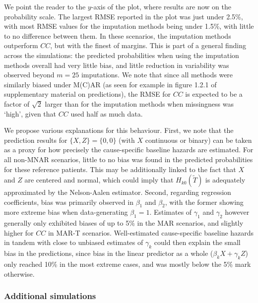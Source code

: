 \documentclass[
  letterpaper,
  DIV=11,
  numbers=noendperiod]{scrreprt}
\begin{document}
We point the reader to the \(y\)-axis of the plot, where results are now
on the probability scale. The largest RMSE reported in the plot was just
under 2.5\%, with most RMSE values for the imputation methods being
under 1.5\%, with little to no difference between them. In these
scenarios, the imputation methods outperform \(CC\), but with the finest
of margins. This is part of a general finding across the simulations:
the predicted probabilities when using the imputation methods overall
had very little bias, and little reduction in variability was observed
beyond \(m = 25\) imputations. We note that since all methods were
similarly biased under M(C)AR (as seen for example in figure 1.2.1 of
supplementary material on predictions), the RMSE for \(CC\) is expected
to be a factor of \(\sqrt{2}\) larger than for the imputation methods
when missingness was `high', given that \(CC\) used half as much data.

We propose various explanations for this behaviour. First, we note that
the prediction results for \(\{X,Z\} = \{0, 0\}\) (with \(X\) continuous
or binary) can be taken as a proxy for how precisely the cause-specific
baseline hazards are estimated. For all non-MNAR scenarios, little to no
bias was found in the predicted probabilities for these reference
patients. This may be additionally linked to the fact that \(X\) and
\(Z\) are centered and normal, which could imply that
\(H_{k0}(\tilde{T})\) is adequately approximated by the Nelson-Aalen
estimator. Second, regarding regression coefficients, bias was primarily
observed in \(\beta_1\) and \(\beta_2\), with the former showing more
extreme bias when data-generating \(\beta_1 = 1\). Estimates of
\(\gamma_1\) and \(\gamma_2\) however generally only exhibited biases of
up to 5\% in the MAR scenarios, and slightly higher for \(CC\) in MAR-T
scenarios. Well-estimated cause-specific baseline hazards in tandem with
close to unbiased estimates of \(\gamma_k\) could then explain the small
bias in the predictions, since bias in the linear predictor as a whole
(\(\beta_k X + \gamma_k Z\)) only reached 10\% in the most extreme
cases, and was mostly below the 5\% mark otherwise.

\hypertarget{additional-simulations}{%
\subsubsection{Additional simulations}\label{additional-simulations}}
\end{document}
